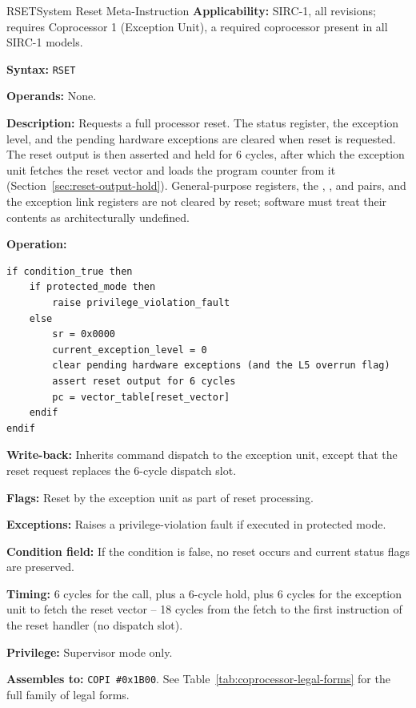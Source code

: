 \begin{instructionbox}{RSET}{System Reset Meta-Instruction}
	\textbf{Applicability:} SIRC-1, all revisions; requires Coprocessor 1 (Exception Unit), a required coprocessor
	present in all SIRC-1 models.

	\textbf{Syntax:} \texttt{RSET}

	\textbf{Operands:} None.

	\textbf{Description:} Requests a full processor reset. The status register, the exception level, and the pending
	hardware exceptions are cleared when reset is requested. The reset output is then asserted and held for 6 cycles,
	after which the exception unit fetches the reset vector and loads the program counter from it
	(Section~\ref{sec:reset-output-hold}). General-purpose registers, the , , and  pairs, and the exception link
	registers are not cleared by reset; software must treat their contents as architecturally undefined.

	\textbf{Operation:}
	\begin{verbatim}
if condition_true then
    if protected_mode then
        raise privilege_violation_fault
    else
        sr = 0x0000
        current_exception_level = 0
        clear pending hardware exceptions (and the L5 overrun flag)
        assert reset output for 6 cycles
        pc = vector_table[reset_vector]
    endif
endif
\end{verbatim}

	\textbf{Write-back:} Inherits  command dispatch to the exception unit, except that the reset request
	replaces the 6-cycle dispatch slot.

	\textbf{Flags:} Reset by the exception unit as part of reset processing.

	\textbf{Exceptions:} Raises a privilege-violation fault if executed in protected mode.

	\textbf{Condition field:} If the condition is false, no reset occurs and current status flags are preserved.

	\textbf{Timing:} 6 cycles for the call, plus a 6-cycle  hold, plus 6 cycles for the exception unit to
	fetch the reset vector -- 18 cycles from the  fetch to the first instruction of the reset handler (no
	dispatch slot).

	\textbf{Privilege:} Supervisor mode only.

	\textbf{Assembles to:} \texttt{COPI \#0x1B00}. See Table~\ref{tab:coprocessor-legal-forms} for the full family of legal forms.


\end{instructionbox}
